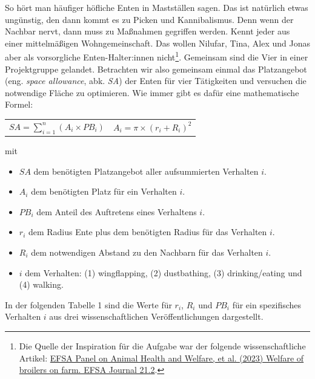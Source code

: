 \documentclass[a4paper, 9pt]{scrartcl}\usepackage[]{graphicx}\usepackage[]{xcolor}
\begin{document}
So hört man häufiger höfliche Enten in Mastställen sagen. Das ist natürlich etwas ungünstig, den dann kommt es zu Picken und Kannibalismus. Denn wenn der Nachbar nervt, dann muss zu Maßnahmen gegriffen werden. Kennt jeder aus einer mittelmäßigen Wohngemeinschaft. Das wollen Nilufar, Tina, Alex und Jonas aber als vorsorgliche Enten-Halter:innen nicht\footnote{Die Quelle der Inspiration für die Aufgabe war der folgende wissenschaftliche Artikel: \href{https://www.efsa.europa.eu/en/efsajournal/pub/7788}{EFSA Panel on Animal Health and Welfare, et al. (2023) Welfare of broilers on farm. EFSA Journal 21.2}.}. Gemeinsam sind die Vier in einer Projektgruppe gelandet. Betrachten wir also gemeinsam einmal das Platzangebot (eng. \textit{space allowance}, abk. \textit{SA}) der Enten für vier Tätigkeiten und versuchen die notwendige Fläche zu optimieren. Wie immer gibt es dafür eine mathematische Formel:

\begin{center}
  \begin{tabular}{cc}
    $SA = \sum^n_{i = 1} (A_i \times PB_i)$ & $A_i = \pi \times (r_i + R_i)^2$\\
  \end{tabular}
\end{center}

\vspace{-2Ex}

mit

\begin{itemize}[noitemsep]
\item $SA$ dem benötigten Platzangebot aller aufsummierten Verhalten $i$.
\item $A_i$ dem benötigten Platz für ein Verhalten $i$. 
\item $PB_i$ dem Anteil des Auftretens eines Verhaltens $i$.
\item $r_i$ dem Radius Ente plus dem benötigten Radius für das Verhalten $i$.
\item $R_i$ dem notwendigen Abstand zu den Nachbarn für das Verhalten $i$.    
\item $i$ dem Verhalten: (1) wingflapping, (2) dustbathing, (3)
  drinking/eating und (4) walking.
\end{itemize}

In der folgenden Tabelle 1 sind die Werte für $r_i$, $R_i$ und $PB_i$ für ein spezifisches Verhalten $i$ aus drei wissenschaftlichen Veröffentlichungen dargestellt.

\vspace{-1Ex}
\end{document}
